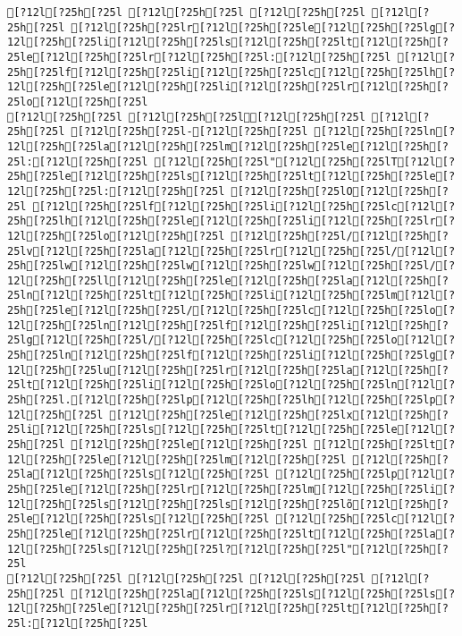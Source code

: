 \documentclass{scrartcl}
\begin{document}
\begin{Verbatim}
[?12l[?25h[?25l [?12l[?25h[?25l [?12l[?25h[?25l [?12l[?25h[?25l [?12l[?25h[?25lr[?12l[?25h[?25le[?12l[?25h[?25lg[?12l[?25h[?25li[?12l[?25h[?25ls[?12l[?25h[?25lt[?12l[?25h[?25le[?12l[?25h[?25lr[?12l[?25h[?25l:[?12l[?25h[?25l [?12l[?25h[?25lf[?12l[?25h[?25li[?12l[?25h[?25lc[?12l[?25h[?25lh[?12l[?25h[?25le[?12l[?25h[?25li[?12l[?25h[?25lr[?12l[?25h[?25lo[?12l[?25h[?25l
[?12l[?25h[?25l [?12l[?25h[?25l[?12l[?25h[?25l [?12l[?25h[?25l [?12l[?25h[?25l-[?12l[?25h[?25l [?12l[?25h[?25ln[?12l[?25h[?25la[?12l[?25h[?25lm[?12l[?25h[?25le[?12l[?25h[?25l:[?12l[?25h[?25l [?12l[?25h[?25l"[?12l[?25h[?25lT[?12l[?25h[?25le[?12l[?25h[?25ls[?12l[?25h[?25lt[?12l[?25h[?25le[?12l[?25h[?25l:[?12l[?25h[?25l [?12l[?25h[?25lO[?12l[?25h[?25l [?12l[?25h[?25lf[?12l[?25h[?25li[?12l[?25h[?25lc[?12l[?25h[?25lh[?12l[?25h[?25le[?12l[?25h[?25li[?12l[?25h[?25lr[?12l[?25h[?25lo[?12l[?25h[?25l [?12l[?25h[?25l/[?12l[?25h[?25lv[?12l[?25h[?25la[?12l[?25h[?25lr[?12l[?25h[?25l/[?12l[?25h[?25lw[?12l[?25h[?25lw[?12l[?25h[?25lw[?12l[?25h[?25l/[?12l[?25h[?25ll[?12l[?25h[?25le[?12l[?25h[?25la[?12l[?25h[?25ln[?12l[?25h[?25lt[?12l[?25h[?25li[?12l[?25h[?25lm[?12l[?25h[?25le[?12l[?25h[?25l/[?12l[?25h[?25lc[?12l[?25h[?25lo[?12l[?25h[?25ln[?12l[?25h[?25lf[?12l[?25h[?25li[?12l[?25h[?25lg[?12l[?25h[?25l/[?12l[?25h[?25lc[?12l[?25h[?25lo[?12l[?25h[?25ln[?12l[?25h[?25lf[?12l[?25h[?25li[?12l[?25h[?25lg[?12l[?25h[?25lu[?12l[?25h[?25lr[?12l[?25h[?25la[?12l[?25h[?25lt[?12l[?25h[?25li[?12l[?25h[?25lo[?12l[?25h[?25ln[?12l[?25h[?25l.[?12l[?25h[?25lp[?12l[?25h[?25lh[?12l[?25h[?25lp[?12l[?25h[?25l [?12l[?25h[?25le[?12l[?25h[?25lx[?12l[?25h[?25li[?12l[?25h[?25ls[?12l[?25h[?25lt[?12l[?25h[?25le[?12l[?25h[?25l [?12l[?25h[?25le[?12l[?25h[?25l [?12l[?25h[?25lt[?12l[?25h[?25le[?12l[?25h[?25lm[?12l[?25h[?25l [?12l[?25h[?25la[?12l[?25h[?25ls[?12l[?25h[?25l [?12l[?25h[?25lp[?12l[?25h[?25le[?12l[?25h[?25lr[?12l[?25h[?25lm[?12l[?25h[?25li[?12l[?25h[?25ls[?12l[?25h[?25ls[?12l[?25h[?25lõ[?12l[?25h[?25le[?12l[?25h[?25ls[?12l[?25h[?25l [?12l[?25h[?25lc[?12l[?25h[?25le[?12l[?25h[?25lr[?12l[?25h[?25lt[?12l[?25h[?25la[?12l[?25h[?25ls[?12l[?25h[?25l?[?12l[?25h[?25l"[?12l[?25h[?25l
[?12l[?25h[?25l [?12l[?25h[?25l [?12l[?25h[?25l [?12l[?25h[?25l [?12l[?25h[?25la[?12l[?25h[?25ls[?12l[?25h[?25ls[?12l[?25h[?25le[?12l[?25h[?25lr[?12l[?25h[?25lt[?12l[?25h[?25l:[?12l[?25h[?25l

\end{Verbatim}
\end{document}
